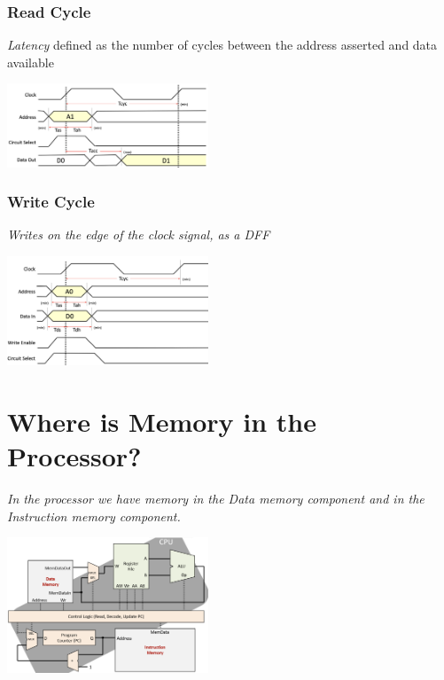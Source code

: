 \subsubsection{Read Cycle}
\textit{Latency} defined as the number of cycles between the address asserted and data available \\ \vspace*{5px}
\begin{center}
    \includegraphics[width=0.45\textwidth]{chapters/chapter1c/images/read_cycle.png}
\end{center}
\subsubsection{Write Cycle}
\textit{Writes on the edge of the clock signal, as a DFF} \\ \vspace*{5px}
\begin{center}
    \includegraphics[width=0.45\textwidth]{chapters/chapter1c/images/write_cycle.png}
\end{center}


\section{Where is Memory in the Processor?}
\textit{In the processor we have memory in the Data memory component and in the Instruction memory component.} \\ \vspace*{5px}
\begin{center}
    \includegraphics[width=0.45\textwidth]{chapters/chapter1c/images/processor.png}
\end{center}
